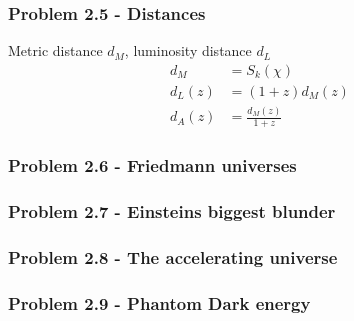 \documentclass[10pt,a4paper]{book}
\theoremstyle{definition}
\begin{document}
\subsubsection{Problem 2.5 - Distances}
Metric distance $d_M$, luminosity distance $d_L$ 
\begin{align}
d_M   &=S_k(\chi)\\
d_L(z)&=(1+z)d_M(z)\\
d_A(z)&=\frac{d_M(z)}{1+z}
\end{align}

\subsubsection{Problem 2.6 - Friedmann universes}
\subsubsection{Problem 2.7 - Einsteins biggest blunder}
\subsubsection{Problem 2.8 - The accelerating universe}
\subsubsection{Problem 2.9 - Phantom Dark energy}
\end{document}

